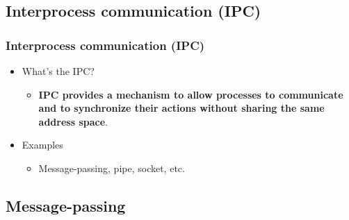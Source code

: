 \documentclass[CJKutf8,xcolor=pdftex,dvipsnames,table]{beamer}
\begin{document}
\begin{CJK*}{UTF8}{song}
  \section{Interprocess communication (IPC)}

  \begin{frame}
  \frametitle{Interprocess communication (IPC)} \pause
  \begin{itemize}
  \item{What's the IPC?} \pause
    \begin{itemize}
    \item{\textbf{IPC provides a mechanism to allow processes to communicate and to synchronize their actions without sharing the same address space}.} \pause
    \end{itemize}
  \item{Examples} \pause
    \begin{itemize}
    \item{Message-passing, pipe, socket, etc.} \pause
    \end{itemize}
  \end{itemize}
  \end{frame}

  \iffalse

  \subsection{Message-passing}


\end{CJK*}
\end{document}
